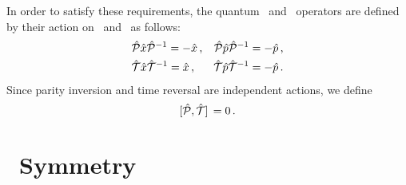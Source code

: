         In order to satisfy these requirements, the quantum \hP\ and \hT\ operators are defined by their action on \hx\ and \hp\ as follows:
        \begin{align}
            \label{eq:quantum-P}
            &\mathcal{\hat{P}}\hat{x}\mathcal{\hat{P}}^{-1} = -\hat{x}
            \,\text{,}
            &\mathcal{\hat{P}}\hat{p}\mathcal{\hat{P}}^{-1} = -\hat{p}
            \,\text{,}
            \\
            \label{eq:quantum-T}
            &\mathcal{\hat{T}}\hat{x}\mathcal{\hat{T}}^{-1} = \hat{x}
            \,\text{,}
            &\mathcal{\hat{T}}\hat{p}\mathcal{\hat{T}}^{-1} = -\hat{p}
            \,\text{.}
        \end{align}
        Since parity inversion and time reversal are independent actions, we define
        \begin{equation}
            \label{eq:PT-commutator}
            \comm*{\hP}{\hT} = 0
            \myperiod
        \end{equation}



    \section{\PT\ Symmetry}